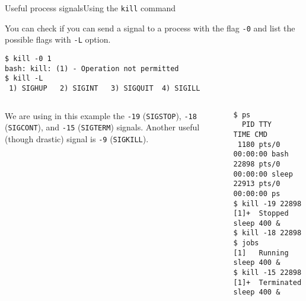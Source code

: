 \begin{frame}[t,fragile]{Useful process signals}{Using the  \alert{\texttt{kill}} command}
  \vspace{-0.35cm}
  \begin{block}{}
    {\footnotesize
You can check if you can send a signal to a process with the flag \alert{\texttt{-0}} and list the possible flags with \alert{\texttt{-L}} option.}
{\scriptsize
      \begin{lstlisting}
$ kill -0 1
bash: kill: (1) - Operation not permitted
$ kill -L
 1) SIGHUP	 2) SIGINT	 3) SIGQUIT	 4) SIGILL
      \end{lstlisting}
} 

{\scriptsize

  \begin{columns}
       We are using in this example the \alert{\texttt{-19} (\texttt{SIGSTOP})}, \alert{\texttt{-18} (\texttt{SIGCONT})}, and \alert{\texttt{-15} (\texttt{SIGTERM})} signals. Another useful (though drastic) signal is \alert{\texttt{-9} (\texttt{SIGKILL})}.  
        \hspace{-3cm}
        \begin{lstlisting}
$ ps
  PID TTY          TIME CMD
 1180 pts/0    00:00:00 bash
22898 pts/0    00:00:00 sleep
22913 pts/0    00:00:00 ps
$ kill -19 22898
[1]+  Stopped                 sleep 400 &
$ kill -18 22898
$ jobs
[1]   Running                 sleep 400 &
$ kill -15 22898
[1]+  Terminated              sleep 400 &
        \end{lstlisting}
    \end{columns}
  }
  \end{block}
  
\end{frame}
